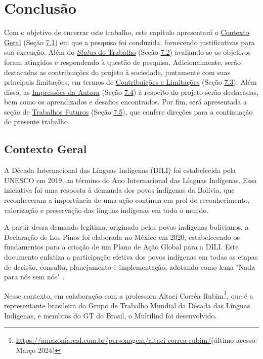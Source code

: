 \chapter[Conclusão]{Conclusão}
\label{chap:Conclusão}
Com o objetivo de encerrar este trabalho, este capítulo apresentará o \hyperref[sec:Contexto Geral]{Contexto Geral} (Seção \hyperref[sec:Contexto Geral]{7.1}) 
em que a pesquisa foi conduzida, fornecendo justificativas para sua execução. Além do \hyperref[sec:Status do Trabalho]{\textit{Status} 
do Trabalho} (Seção \hyperref[sec:Status do Trabalho]{7.2}) avaliando se os objetivos foram atingidos e respondendo à questão de pesquisa. Adicionalmente, 
serão destacadas as contribuições do projeto à sociedade, juntamente com suas principais limitações, em termos de 
\hyperref[sec:Contribuições e Limitações]{Contribuições e Limitações} (Seção \hyperref[sec:Contexto Geral]{7.3}). Além disso, as \hyperref[sec:Impressões da Autora]{Impressões da Autora} 
(Seção \hyperref[sec:Impressões da Autora]{7.4}) à respeito do projeto serão destacadas, bem como os aprendizados e desafios encontrados. Por fim, será apresentada a seção de 
\hyperref[sec:Trabalhos Futuros]{Trabalhos Futuros} (Seção \hyperref[sec:Trabalhos Futuros]{7.5}), 
que confere direções para a continuação do presente trabalho.

\section{Contexto Geral}
\label{sec:Contexto Geral}
A Década Internacional das Línguas Indígenas (DILI) foi estabelecida pela UNESCO em 2019, ao término do Ano Internacional das Línguas 
Indígenas. Essa iniciativa foi uma resposta à demanda dos povos indígenas da Bolívia, que reconheceram a importância de uma ação contínua em prol do reconhecimento, 
valorização e preservação das línguas indígenas em todo o mundo. 

A partir dessa demanda legítima, originada pelos povos indígenas bolivianos, a Declaração de Los Pinos foi elaborada no México em 2020, estabelecendo os fundamentos 
para a criação de um Plano de Ação Global para a DILI. Este documento enfatiza a participação efetiva dos povos indígenas em todas as etapas de decisão, consulta, 
planejamento e implementação, adotando como lema "Nada para nós sem nós" \cite{gtbrasil2024}.

Nesse contexto, em colaboração com a professora Altaci Corrêa Rubim\footnote{\url{https://amazoniareal.com.br/personagem/altaci-correa-rubim/}(último acesso: Março 2024)}, 
que é a representante brasileira do Grupo de Trabalho Mundial da Década das Línguas Indígenas, e membros do GT do Brasil, o Multilind foi desenvolvido. 

